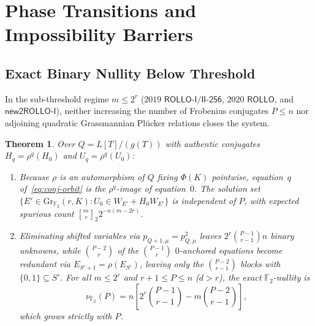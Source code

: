 \documentclass[11pt,a4paper]{article}
\newtheorem{theorem}{Theorem}
\theoremstyle{definition}
\theoremstyle{remark}
\newcommand{\Ftwo}{\mathbb{F}_2}
\newcommand{\Gr}{\mathrm{Gr}}
\begin{document}
\section{Phase Transitions and Impossibility Barriers}
\label{sec:barriers}

\subsection{Exact Binary Nullity Below Threshold}
In the sub-threshold regime $m \le 2^r$ ($2019$ $\mathsf{ROLLO\text{-}I/II\text{-}256}$, $2020$ $\mathsf{ROLLO}$, and $\mathsf{new2ROLLO\text{-}I}$), neither increasing the number of Frobenius conjugates $P \le n$ nor adjoining quadratic Grassmannian Pl\"{u}cker relations closes the system.

\begin{theorem}
\label{thm:dichotomy}
Over $Q = L[T]/(g(T))$ with authentic conjugates $H_q = \rho^q(H_0)$ and $U_q = \rho^q(U_0)$:
\begin{enumerate}[leftmargin=1.8em,itemsep=2pt]
    \item Because $\rho$ is an automorphism of $Q$ fixing $\Phi(K)$ pointwise, equation~$q$ of~\eqref{eq:conj-orbit} is the $\rho^q$-image of equation~$0$. The solution set $\{E' \in \Gr_{\Ftwo}(r, K) : U_0 \in W_{E'} + H_0 W_{E'}\}$ is independent of $P$, with expected spurious count $\genfrac{[}{]}{0pt}{}{m}{r}_2 2^{-n(m - 2r)}$.
    \item Eliminating shifted variables via $p_{Q+1,\mu} = p_{Q,\mu}^2$ leaves $2^r \binom{P-1}{r-1} n$ binary unknowns, while $\binom{P-2}{r}$ of the $\binom{P-1}{r}$ $0$-anchored equations become redundant via $E_{S'+1} = \rho(E_{S'})$, leaving only the $\binom{P-2}{r-1}$ blocks with $\{0, 1\} \subseteq S'$. For all $m \le 2^r$ and $r+1 \le P \le n$ ($d > r$), the exact $\Ftwo$-nullity is
    \begin{equation}
    \label{eq:binary-nullity}
        \nu_{\Ftwo}(P) = n \left[ 2^r \binom{P-1}{r-1} - m \binom{P-2}{r-1} \right],
    \end{equation}
    which grows strictly with $P$.
\end{enumerate}
\end{theorem}
\end{document}

